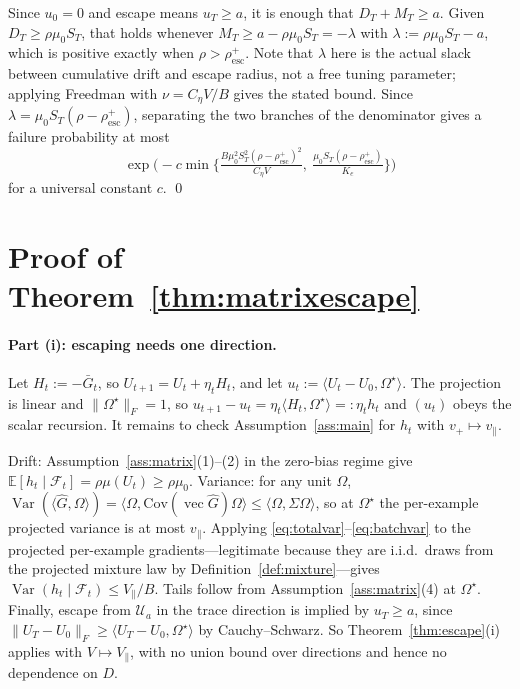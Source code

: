 \documentclass{article}
\theoremstyle{plain}
\theoremstyle{definition}
\theoremstyle{remark}
\newcommand{\E}{\mathbb{E}}
\newcommand{\Var}{\operatorname{Var}}
\newcommand{\1}{\mathbf{1}}
\newcommand{\cU}{\mathcal{U}}
\newcommand{\cF}{\mathcal{F}}
\newcommand{\vecop}{\operatorname{vec}}
\newcommand{\Om}{\Omega}
\begin{document}
Since $u_0=0$ and escape means $u_T\ge a$, it is enough that $D_T+M_T\ge a$.
Given $D_T\ge\rho\mu_0S_T$, that holds whenever
$M_T\ge a-\rho\mu_0S_T = -\lambda$ with $\lambda := \rho\mu_0S_T-a$, which is
positive exactly when $\rho>\rho^{+}_{\mathrm{esc}}$. Note that $\lambda$ here is
the actual slack between cumulative drift and escape radius, not a free tuning
parameter; applying Freedman with $\nu = C_\eta V/B$ gives the stated bound.
Since $\lambda = \mu_0S_T(\rho-\rho^{+}_{\mathrm{esc}})$, separating the two
branches of the denominator gives a failure probability at most
\[
\exp\Big(-c\min\Big\{\tfrac{B\mu_0^2S_T^2(\rho-\rho^{+}_{\mathrm{esc}})^2}{C_\eta V},\
\tfrac{\mu_0S_T(\rho-\rho^{+}_{\mathrm{esc}})}{K_e}\Big\}\Big)
\]
for a universal constant $c$. \qed

\section{Proof of Theorem~\ref{thm:matrixescape}}
\label{app:matrix}

\paragraph{Part (i): escaping needs one direction.}
Let $H_t := -\bar G_t$, so $U_{t+1} = U_t+\eta_tH_t$, and let
$u_t := \langle U_t-U_0,\Om^\star\rangle$. The projection is linear and
$\|\Om^\star\|_F = 1$, so $u_{t+1}-u_t = \eta_t\langle H_t,\Om^\star\rangle
=: \eta_th_t$ and $(u_t)$ obeys the scalar recursion. It remains to check
Assumption~\ref{ass:main} for $h_t$ with $v_+\mapsto v_\parallel$.

Drift: Assumption~\ref{ass:matrix}(1)--(2) in the zero-bias regime give
$\E[h_t\mid\cF_t] = \rho\mu(U_t)\ge\rho\mu_0$. Variance: for any unit $\Om$,
$\Var(\langle\hat G,\Om\rangle) =
\langle\Om,\mathrm{Cov}(\vecop\hat G)\Om\rangle\le\langle\Om,\Sigma\Om\rangle$,
so at $\Om^\star$ the per-example projected variance is at most $v_\parallel$.
Applying \eqref{eq:totalvar}--\eqref{eq:batchvar} to the projected per-example
gradients---legitimate because they are i.i.d.\ draws from the projected mixture
law by Definition~\ref{def:mixture}---gives $\Var(h_t\mid\cF_t)\le V_\parallel/B$.
Tails follow from Assumption~\ref{ass:matrix}(4) at $\Om^\star$. Finally, escape
from $\cU_a$ in the trace direction is implied by $u_T\ge a$, since
$\|U_T-U_0\|_F\ge\langle U_T-U_0,\Om^\star\rangle$ by Cauchy--Schwarz. So
Theorem~\ref{thm:escape}(i) applies with $V\mapsto V_\parallel$, with no union
bound over directions and hence no dependence on $D$.
\end{document}
